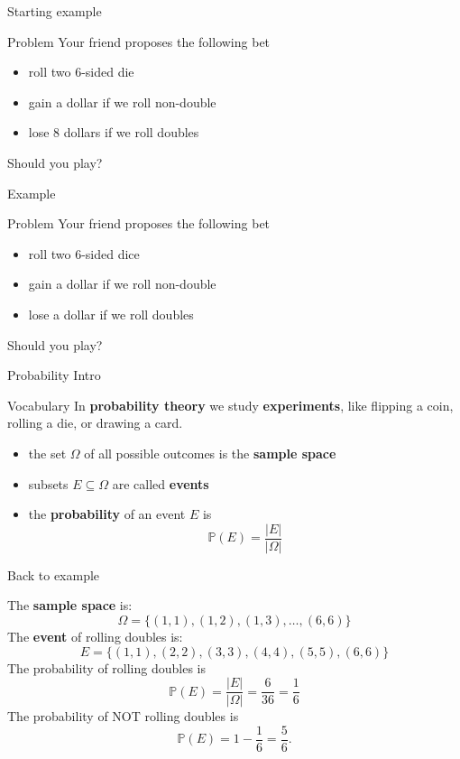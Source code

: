 \documentclass{beamer}
\begin{document}
\begin{frame}{Starting example}
  \begin{block}{Problem}
    Your friend proposes the following bet
    \begin{itemize}
\pause
      \item roll two $6$-sided die
\pause
      \item gain a dollar if we roll non-double
\pause
      \item lose $8$ dollars if we roll doubles
    \end{itemize}
    Should you play?
  \end{block}
\end{frame}

\begin{frame}{Example}
  \begin{block}{Problem}
    Your friend proposes the following bet
    \begin{itemize}
\pause
      \item roll two $6$-sided dice
\pause
      \item gain a dollar if we roll non-double
\pause
      \item lose a dollar if we roll doubles
    \end{itemize}
    Should you play?
  \end{block}
\end{frame}

\begin{frame}{Probability Intro}
  \begin{block}{Vocabulary}
    In \textbf{probability theory} we study \textbf{experiments}, like flipping a coin, rolling a die, or drawing a card.\\
    \begin{itemize}
\pause
      \item the set $\Omega$ of all possible outcomes is the \textbf{sample space}
\pause
      \item subsets $E\subseteq \Omega$ are called \textbf{events}
\pause
      \item the \textbf{probability} of an event $E$ is
      $$\mathbb{P}(E) = \frac{|E|}{|\Omega|}$$
    \end{itemize}
  \end{block}
\end{frame}

\begin{frame}{Back to example}
  \begin{block}
\pause
    The \textbf{sample space} is:
    $$\Omega = \{(1,1),(1,2),(1,3),\dots, (6,6)\}$$
\pause
    The \textbf{event} of rolling doubles is:
    $$E = \{(1,1),(2,2),(3,3),(4,4),(5,5),(6,6)\}$$
\pause
    The probability of rolling doubles is
    $$\mathbb{P}(E) = \frac{|E|}{|\Omega|} = \frac{6}{36} = \frac{1}{6}$$
\pause
    The probability of NOT rolling doubles is
    $$\mathbb{P}(E) = 1-\frac{1}{6} = \frac{5}{6}.$$
  \end{block}
\end{frame}
\end{document}
